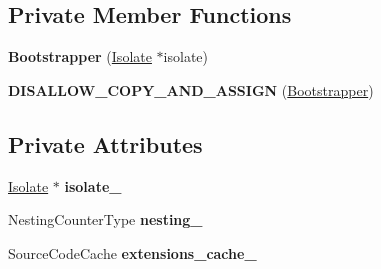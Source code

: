 \subsection*{Private Member Functions}
\begin{DoxyCompactItemize}
\item 
{\bfseries Bootstrapper} (\hyperlink{classv8_1_1internal_1_1_isolate}{Isolate} $\ast$isolate)\hypertarget{classv8_1_1internal_1_1_bootstrapper_af40d172ee28b08a0f6a6ebf4b606dfd1}{}\label{classv8_1_1internal_1_1_bootstrapper_af40d172ee28b08a0f6a6ebf4b606dfd1}

\item 
{\bfseries D\+I\+S\+A\+L\+L\+O\+W\+\_\+\+C\+O\+P\+Y\+\_\+\+A\+N\+D\+\_\+\+A\+S\+S\+I\+GN} (\hyperlink{classv8_1_1internal_1_1_bootstrapper}{Bootstrapper})\hypertarget{classv8_1_1internal_1_1_bootstrapper_a5d95d41141a8bd8e231cf432447b728b}{}\label{classv8_1_1internal_1_1_bootstrapper_a5d95d41141a8bd8e231cf432447b728b}

\end{DoxyCompactItemize}
\subsection*{Private Attributes}
\begin{DoxyCompactItemize}
\item 
\hyperlink{classv8_1_1internal_1_1_isolate}{Isolate} $\ast$ {\bfseries isolate\+\_\+}\hypertarget{classv8_1_1internal_1_1_bootstrapper_aae2edc2adf7aefab28fbeca69ac70a94}{}\label{classv8_1_1internal_1_1_bootstrapper_aae2edc2adf7aefab28fbeca69ac70a94}

\item 
Nesting\+Counter\+Type {\bfseries nesting\+\_\+}\hypertarget{classv8_1_1internal_1_1_bootstrapper_a9775d58ae002bdf9f2fa22bc59145424}{}\label{classv8_1_1internal_1_1_bootstrapper_a9775d58ae002bdf9f2fa22bc59145424}

\item 
Source\+Code\+Cache {\bfseries extensions\+\_\+cache\+\_\+}\hypertarget{classv8_1_1internal_1_1_bootstrapper_a822deef0388459ac6e329f6f0117ca74}{}\label{classv8_1_1internal_1_1_bootstrapper_a822deef0388459ac6e329f6f0117ca74}

\end{DoxyCompactItemize}
